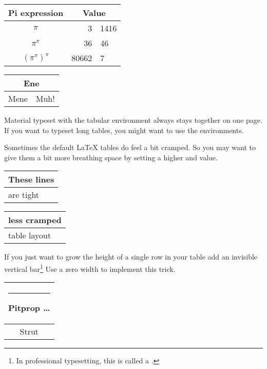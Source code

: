 \begin{example}
\begin{tabular}{c r @{.} l}
Pi expression       &
\multicolumn{2}{c}{Value} \\
\hline
$\pi$               & 3&1416  \\
$\pi^{\pi}$         & 36&46   \\
$(\pi^{\pi})^{\pi}$ & 80662&7 \\
\end{tabular}
\end{example}

\begin{example}
\begin{tabular}{|c|c|}
\hline
\multicolumn{2}{|c|}{Ene} \\
\hline
Mene & Muh! \\
\hline
\end{tabular}
\end{example}

Material typeset with the tabular environment always stays together on one
page. If you want to typeset long tables, you might want to use the
 environments.

Sometimes the default \LaTeX{} tables do feel a bit cramped. So you may want
to give them a bit more breathing space by setting a higher
 and  value.

\begin{example}
\begin{tabular}{|l|}
\hline
These lines\\\hline
are tight\\\hline
\end{tabular}

{\renewcommand{\arraystretch}{1.5}
\renewcommand{\tabcolsep}{0.2cm}
\begin{tabular}{|l|}
\hline
less cramped\\\hline
table layout\\\hline
\end{tabular}}

\end{example}

If you just want to grow the height of a single row in your table add an invisible vertical bar\footnote{In professional typesetting,
this is called a .} Use a zero width  to implement this trick.

\begin{example}
\begin{tabular}{|c|}
\hline
\rule{1pt}{4ex}Pitprop \ldots\\
\hline
\rule{0pt}{4ex}Strut\\
\hline
\end{tabular}
\end{example}

